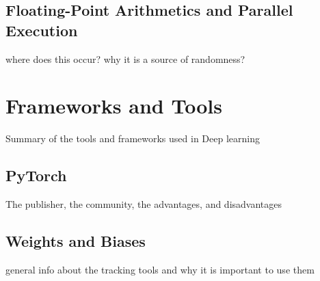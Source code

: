 \subsection{Floating-Point Arithmetics and Parallel Execution}
where does this occur? why it is a source of randomness?
\section{Frameworks and Tools} 
Summary of the tools and frameworks used in Deep learning
\subsection{PyTorch}
The publisher, the community, the advantages, and disadvantages
\subsection{Weights and Biases}
general info about the tracking tools and why it is important to use them
 
